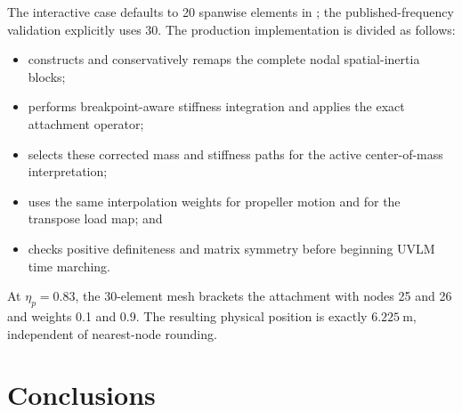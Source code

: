\documentclass[11pt,a4paper]{article}
\begin{document}
The interactive case defaults to 20 spanwise elements in
; the published-frequency validation explicitly uses 30.
The production implementation is divided as follows:
\begin{itemize}
  \item {} constructs and conservatively remaps
        the complete nodal spatial-inertia blocks;
  \item {} performs breakpoint-aware
        stiffness integration and applies the exact attachment operator;
  \item {} selects these corrected mass and
        stiffness paths for the active center-of-mass interpretation;
  \item {} uses the same interpolation weights for
        propeller motion and for the transpose load map; and
  \item {} checks positive definiteness
        and matrix symmetry before beginning UVLM time marching.
\end{itemize}

At \(\eta_p=0.83\), the 30-element mesh brackets the attachment with nodes 25
and 26 and weights 0.1 and 0.9.  The resulting physical position is exactly
\(6.225\ \mathrm{m}\), independent of nearest-node rounding.

\section{Conclusions}
\end{document}
